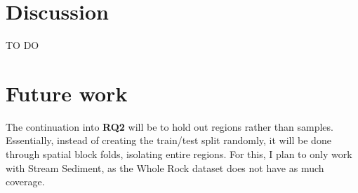 \documentclass[
    a4paper,
    11pt,
    oneside,
    numbers=noendperiod,
    abstract=true
]{scrartcl}
\begin{document}
\section{Discussion}
\label{ch:discussion}

TO DO


\section{Future work}
\label{ch:conclusion}

The continuation into \textbf{RQ2} will be to hold out regions rather than samples. Essentially, instead of creating the train/test split randomly, it will be done through spatial block folds, isolating entire regions. For this, I plan to only work with Stream Sediment, as the Whole Rock dataset does not have as much coverage.






\appendix
 
\end{document}
